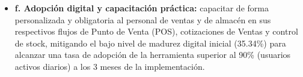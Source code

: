 \begin{indentedsubsection}
\begin{itemize}
    \item \textbf{f. Adopción digital y capacitación práctica:} capacitar de forma personalizada y obligatoria al personal de ventas y de almacén en sus respectivos flujos de Punto de Venta (POS), cotizaciones de Ventas y control de stock, mitigando el bajo nivel de madurez digital inicial (35.34\%) para alcanzar una tasa de adopción de la herramienta superior al 90\% (usuarios activos diarios) a los 3 meses de la implementación.
\end{itemize}
\end{indentedsubsection}
